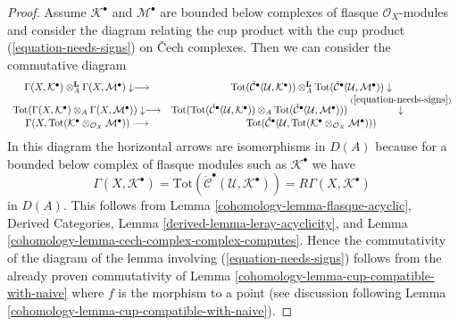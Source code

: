 \begin{proof}
\medskip\noindent
Assume $\mathcal{K}^\bullet$ and $\mathcal{M}^\bullet$ are bounded
below complexes of flasque $\mathcal{O}_X$-modules and
consider the diagram relating the cup product with the cup product
(\ref{equation-needs-signs}) on {\v C}ech complexes.
Then we can consider the commutative diagram
$$
\begin{array}{cc}\Gamma(X, \mathcal{K}^\bullet)
\otimes_A^\mathbf{L}
\Gamma(X, \mathcal{M}^\bullet) \downarrow\longrightarrow & \text{Tot}(\check{\mathcal{C}}^\bullet(\mathcal{U}, \mathcal{K}^\bullet))
\otimes_A^\mathbf{L}
\text{Tot}(\check{\mathcal{C}}^\bullet(\mathcal{U}, \mathcal{M}^\bullet))
\downarrow \\ \text{Tot}(\Gamma(X, \mathcal{K}^\bullet)
\otimes_A
\Gamma(X, \mathcal{M}^\bullet)) \downarrow\longrightarrow & \text{Tot}(
\text{Tot}(\check{\mathcal{C}}^\bullet(\mathcal{U}, \mathcal{K}^\bullet))
\otimes_A
\text{Tot}(\check{\mathcal{C}}^\bullet(\mathcal{U}, \mathcal{M}^\bullet)))
\overset{(\ref{equation-needs-signs})}{\downarrow} \\ \Gamma(X, \text{Tot}(\mathcal{K}^\bullet
\otimes_{\mathcal{O}_X}
\mathcal{M}^\bullet)) \longrightarrow & \text{Tot}(
\check{\mathcal{C}}^\bullet({\mathcal U},
\text{Tot}(\mathcal{K}^\bullet \otimes_{\mathcal{O}_X} \mathcal{M}^\bullet)
))\end{array}
$$
In this diagram the horizontal arrows are isomorphisms in $D(A)$ because
for a bounded below complex of flasque modules such as $\mathcal{K}^\bullet$
we have
$$
\Gamma(X, \mathcal{K}^\bullet) =
\text{Tot}(\check{\mathcal{C}}^\bullet(\mathcal{U}, \mathcal{K}^\bullet)) =
R\Gamma(X, \mathcal{K}^\bullet)
$$
in $D(A)$. This follows from
Lemma \ref{cohomology-lemma-flasque-acyclic},
Derived Categories, Lemma \ref{derived-lemma-leray-acyclicity}, and
Lemma \ref{cohomology-lemma-cech-complex-complex-computes}.
Hence the commutativity of the diagram of the lemma involving
(\ref{equation-needs-signs}) follows from the already proven
commutativity of Lemma \ref{cohomology-lemma-cup-compatible-with-naive}
where $f$ is the morphism to a point (see discussion
following Lemma \ref{cohomology-lemma-cup-compatible-with-naive}).
\end{proof}

